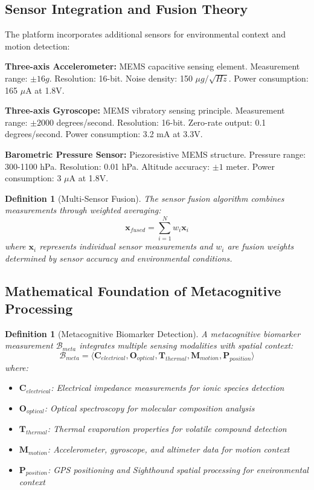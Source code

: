 \documentclass[12pt,a4paper]{article}
\newtheorem{definition}[theorem]{Definition}
\begin{document}
\subsection{Sensor Integration and Fusion Theory}

The platform incorporates additional sensors for environmental context and motion detection:

\textbf{Three-axis Accelerometer:} MEMS capacitive sensing element. Measurement range: \(\pm 16g\). Resolution: 16-bit. Noise density: 150 \(\mu g/\sqrt{Hz}\). Power consumption: 165 \(\mu\)A at 1.8V.

\textbf{Three-axis Gyroscope:} MEMS vibratory sensing principle. Measurement range: \(\pm 2000\) degrees/second. Resolution: 16-bit. Zero-rate output: 0.1 degrees/second. Power consumption: 3.2 mA at 3.3V.

\textbf{Barometric Pressure Sensor:} Piezoresistive MEMS structure. Pressure range: 300-1100 hPa. Resolution: 0.01 hPa. Altitude accuracy: \(\pm 1\) meter. Power consumption: 3 \(\mu\)A at 1.8V.

\begin{definition}[Multi-Sensor Fusion]
The sensor fusion algorithm combines measurements through weighted averaging:
\begin{equation}
\mathbf{x}_{fused} = \sum_{i=1}^{N} w_i \mathbf{x}_i
\end{equation}
where \(\mathbf{x}_i\) represents individual sensor measurements and \(w_i\) are fusion weights determined by sensor accuracy and environmental conditions.
\end{definition}

\subsection{Mathematical Foundation of Metacognitive Processing}

\begin{definition}[Metacognitive Biomarker Detection]
A metacognitive biomarker measurement \(\mathcal{B}_{meta}\) integrates multiple sensing modalities with spatial context:
\begin{equation}
\mathcal{B}_{meta} = \langle \mathbf{C}_{electrical}, \mathbf{O}_{optical}, \mathbf{T}_{thermal}, \mathbf{M}_{motion}, \mathbf{P}_{position} \rangle
\end{equation}
where:
\begin{itemize}
\item \(\mathbf{C}_{electrical}\): Electrical impedance measurements for ionic species detection
\item \(\mathbf{O}_{optical}\): Optical spectroscopy for molecular composition analysis
\item \(\mathbf{T}_{thermal}\): Thermal evaporation properties for volatile compound detection
\item \(\mathbf{M}_{motion}\): Accelerometer, gyroscope, and altimeter data for motion context
\item \(\mathbf{P}_{position}\): GPS positioning and Sighthound spatial processing for environmental context
\end{itemize}
\end{definition}
\end{document}

